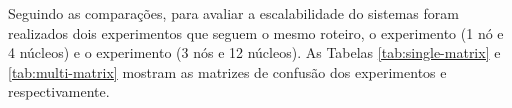 




Seguindo as comparações, para avaliar a escalabilidade do sistemas foram
realizados dois experimentos que seguem o mesmo roteiro, o experimento \expC (1 nó e
4 núcleos) e o experimento \expD (3 nós e 12 núcleos).
As Tabelas \ref{tab:single-matrix} e \ref{tab:multi-matrix} mostram as matrizes
de confusão dos experimentos \expC e \expD respectivamente.

